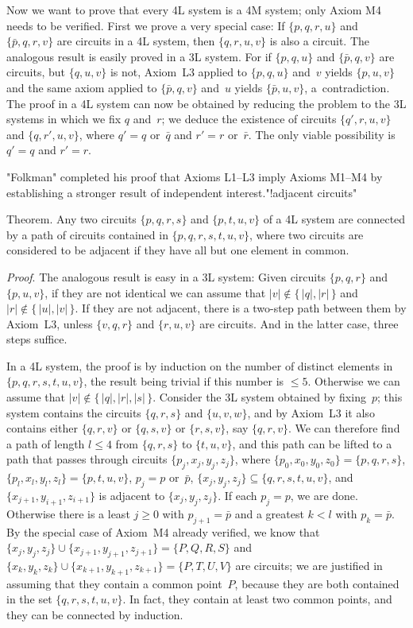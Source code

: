 Now we want to prove that every 4L system is a 4M system; only Axiom
M4 needs to be verified. First we prove a very special case: If
$\{p,q,r,u\}$ and $\{\bar{p},q,r,v\}$ are circuits in a 4L system,
then $\{q,r,u,v\}$ is also a circuit. The analogous result is easily
proved in a 3L system. For if $\{p,q,u\}$ and $\{\bar{p},q,v\}$ are
circuits, but $\{q,u,v\}$ is not, Axiom~L3 applied to $\{p,q,u\}$
and~$v$ yields $\{p,u,v\}$ and the same axiom applied to
$\{\bar{p},q,v\}$ and~$u$ yields $\{\bar{p},u,v\}$, a~contradiction.
The proof in a 4L system can now be obtained by reducing
 the problem to the 3L systems in
which we fix $q$ and~$r$; we deduce the existence of circuits
$\{q',r,u,v\}$ and $\{q,r',u,v\}$, where $q'=q$ or~$\bar{q}$ and $r'=r$
or~$\bar{r}$. The only viable possibility is $q'=q$ and $r'=r$.

"Folkman" completed his proof that Axioms L1--L3 imply Axioms M1--M4 by
establishing a stronger result of independent interest."!adjacent circuits"

\proclaim Theorem. Any two circuits $\{p,q,r,s\}$ and $\{p,t,u,v\}$ of
a 4L system are connected by a path of circuits contained in
$\{p,q,r,s,t,u,v\}$, where two circuits are considered to be adjacent
if they have all but one element in common. 

\noindent
{\it Proof}.\quad
The analogous result is easy in a 3L system: Given circuits
$\{p,q,r\}$ and $\{p,u,v\}$, if they are not identical we can assume
that $\vert v\vert\notin\{\,\vert q\vert,\vert r\vert\,\}$ and $\vert
r\vert\notin\{\,\vert u\vert,\vert v\vert\,\}$. If they are not
adjacent, there is a two-step path between them by Axiom~L3, unless
$\{v,q,r\}$ and $\{r,u,v\}$ are circuits. And in the latter case,
three steps suffice.

In a 4L system, the proof is by induction on the number of distinct
elements in $\{p,q,r,s,t,u,v\}$, the result being trivial if
this number is $\leq 5$. Otherwise we can assume that $\vert
v\vert\notin \{\,\vert q\vert,\vert r\vert,\vert s\vert\,\}$. Consider
the 3L system obtained by fixing~$p$; this system contains the
circuits $\{q,r,s\}$ and $\{u,v,w\}$, and by Axiom~L3 it also contains
either $\{q,r,v\}$ or $\{q,s,v\}$ or $\{r,s,v\}$, say $\{q,r,v\}$. We
can therefore find a path of length $l\leq 4$ from $\{q,r,s\}$ to
$\{t,u,v\}$, and this path can be lifted to a path that passes through
circuits $\{p_j,x_j,y_j,z_j\}$, where
$\{p_0,x_0,y_0,z_0\}=\{p,q,r,s\}$, $\{p_l,x_l,y_l,z_l\}=\{p,t,u,v\}$,
$p_j=p$ or~$\bar{p}$, $\{x_j,y_j,z_j\}\subseteq\{q,r,s,t,u,v\}$, and
$\{x_{j+1},y_{i+1},z_{i+1}\}$ is adjacent to $\{x_j,y_j,z_j\}$. If each
$p_j=p$, we are done. Otherwise there is a least $j\geq 0$ with
$p_{j+1}=\bar{p}$ and a greatest $k<l$ with $p_k=\bar{p}$. By the
special case of Axiom~M4 already verified, we know that
$\{x_j,y_j,z_j\}\cup\{x_{j+1},y_{j+1},z_{j+1}\}=\{P,Q,R,S\}$ and
$\{x_k,y_k,z_k\}\cup\{x_{k+1},y_{k+1},z_{k+1}\}=\{P,T,U,V\}$ are
circuits; we are justified in assuming that they contain a common
point~$P$, because they are both contained in the set
$\{q,r,s,t,u,v\}$. In fact, they contain at least two common points,
and they can be connected by induction.\quad\pfbox

